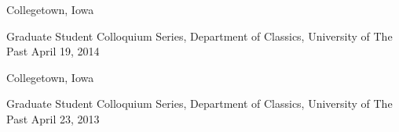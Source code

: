 

\vspace{1ex}

\begin{changemargin}{-0.3in}{0in}
\begin{etaremune} %

\item
\headedsection %
{}
{Collegetown, Iowa} {

\headedsubsection %
{Graduate Student Colloquium Series, Department of Classics,
  University of The Past}
{April 19, 2014}
{%
}
}

\item
\headedsection %
{}
{Collegetown, Iowa} {

\headedsubsection %
{Graduate Student Colloquium Series, Department of Classics, University of
  The Past}
{April 23, 2013}
{%
}
}

\end{etaremune}
\end{changemargin}


\spacedhrule{0.5em}{-0.4em} %
